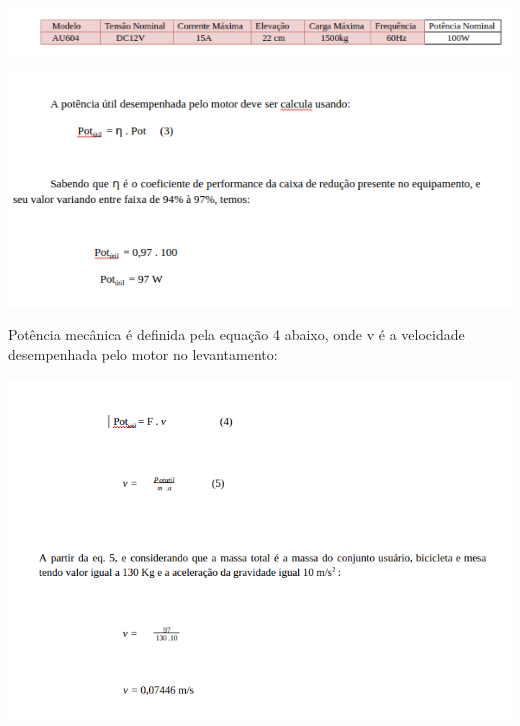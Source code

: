  \begin{center}
      \includegraphics[scale=0.7]{figuras/calculado}
        \label{calculado}
    \end{center}   
                       
    \begin{center}
      \includegraphics[scale=0.7]{figuras/f3}
                \label{f3}
    \end{center}                    

Potência mecânica é definida pela equação 4 abaixo, onde v é a velocidade desempenhada pelo motor no levantamento:  

                         
    \begin{center}
      \includegraphics[scale=0.7]{figuras/f4}
                \label{f4}
    \end{center}
           
